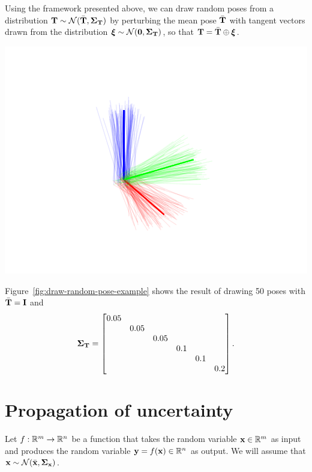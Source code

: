 \begin{example}[frametitle=Drawing random poses from a Gaussian distribution]
Using the framework presented above, we can draw random poses from a distribution ${\boldsymbol{\mathbf{T}}} \sim \mathcal{N}(\bar{{\boldsymbol{\mathbf{T}}}}, {\boldsymbol{\mathbf{\Sigma}}}_{\boldsymbol{\mathbf{T}}})$ by perturbing the mean pose $\bar{{\boldsymbol{\mathbf{T}}}}$ with tangent vectors drawn from the distribution ${\boldsymbol{\mathbf{\xi}}} \sim \mathcal{N}(\boldsymbol{\mathbf{0}}, {\boldsymbol{\mathbf{\Sigma}}}_{\boldsymbol{\mathbf{T}}})$, so that ${\boldsymbol{\mathbf{T}}} = \bar{{\boldsymbol{\mathbf{T}}}} \oplus {\boldsymbol{\mathbf{\xi}}}$.

{
  \centering
  \includegraphics[width=0.75\columnwidth]{figures/draw-random-pose.pdf}
  \captionsetup{type=figure}
  \label{fig:draw-random-pose-example}
  \par
}

Figure~\ref{fig:draw-random-pose-example} shows the result of drawing 50 poses with $\bar{{\boldsymbol{\mathbf{T}}}} = {\boldsymbol{\mathbf{I}}}$ and
\begin{equation*}
  {\boldsymbol{\mathbf{\Sigma}}}_{\boldsymbol{\mathbf{T}}} =
  \begin{bmatrix}
    0.05 & & & & & \\
    & 0.05& & & & \\
    & & 0.05 & & & \\
    & & & 0.1 & & \\
    & & & & 0.1 & \\
    & & & & & 0.2 \\
  \end{bmatrix}.
\end{equation*}
\end{example}

\section{Propagation of uncertainty}
Let $f: {\mathbb R}^m \to {\mathbb R}^n$ be a function that takes the random variable ${\boldsymbol{\mathbf{x}}} \in {\mathbb R}^m$ as input and produces the random variable ${\boldsymbol{\mathbf{y}}} = f({\boldsymbol{\mathbf{x}}}) \in {\mathbb R}^n$ as output.
We will assume that ${\boldsymbol{\mathbf{x}}} \sim \mathcal{N}(\bar{{\boldsymbol{\mathbf{x}}}}, {\boldsymbol{\mathbf{\Sigma}}}_{\boldsymbol{\mathbf{x}}})$.


